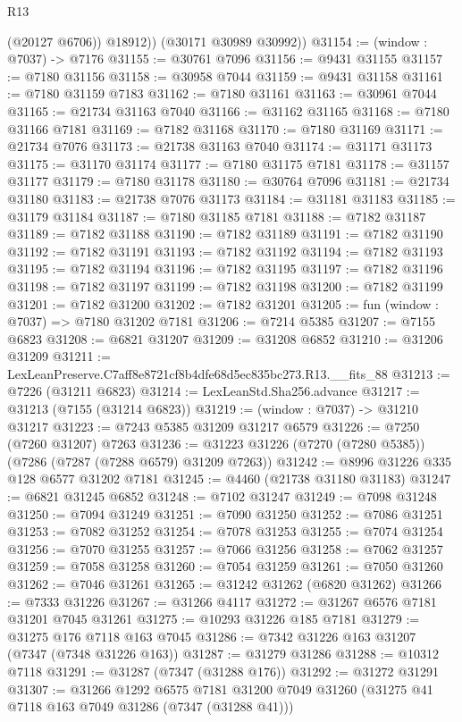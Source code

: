 \begin{lexlean}{R13}
\begin{coremodule}
            (@20127 @6706))
          @18912))
      (@30171 @30989 @30992))
@31154 := (window : @7037) -> @7176
@31155 := @30761 @7096
@31156 := @9431 @31155
@31157 := @7180 @31156
@31158 := @30958 @7044
@31159 := @9431 @31158
@31161 := @7180 @31159 @7183
@31162 := @7180 @31161
@31163 := @30961 @7044
@31165 := @21734 @31163 @7040
@31166 := @31162 @31165
@31168 := @7180 @31166 @7181
@31169 := @7182 @31168
@31170 := @7180 @31169
@31171 := @21734 @7076
@31173 := @21738 @31163 @7040
@31174 := @31171 @31173
@31175 := @31170 @31174
@31177 := @7180 @31175 @7181
@31178 := @31157 @31177
@31179 := @7180 @31178
@31180 := @30764 @7096
@31181 := @21734 @31180
@31183 := @21738 @7076 @31173
@31184 := @31181 @31183
@31185 := @31179 @31184
@31187 := @7180 @31185 @7181
@31188 := @7182 @31187
@31189 := @7182 @31188
@31190 := @7182 @31189
@31191 := @7182 @31190
@31192 := @7182 @31191
@31193 := @7182 @31192
@31194 := @7182 @31193
@31195 := @7182 @31194
@31196 := @7182 @31195
@31197 := @7182 @31196
@31198 := @7182 @31197
@31199 := @7182 @31198
@31200 := @7182 @31199
@31201 := @7182 @31200
@31202 := @7182 @31201
@31205 := fun (window : @7037) => @7180 @31202 @7181
@31206 := @7214 @5385
@31207 := @7155 @6823
@31208 := @6821 @31207
@31209 := @31208 @6852
@31210 := @31206 @31209
@31211 := LexLeanPreserve.C7aff8e8721cf8b4dfe68d5ec835bc273.R13.__fits_88
@31213 := @7226 (@31211 @6823)
@31214 := LexLeanStd.Sha256.advance
@31217 := @31213 (@7155 (@31214 @6823))
@31219 := (window : @7037) -> @31210 @31217
@31223 := @7243 @5385 @31209 @31217 @6579
@31226 := @7250 (@7260 @31207) @7263
@31236 := @31223 @31226 (@7270 (@7280 @5385)) (@7286 (@7287 (@7288 @6579) @31209 @7263))
@31242 := @8996 @31226 @335 @128 @6577 @31202 @7181
@31245 := @4460 (@21738 @31180 @31183)
@31247 := @6821 @31245 @6852
@31248 := @7102 @31247
@31249 := @7098 @31248
@31250 := @7094 @31249
@31251 := @7090 @31250
@31252 := @7086 @31251
@31253 := @7082 @31252
@31254 := @7078 @31253
@31255 := @7074 @31254
@31256 := @7070 @31255
@31257 := @7066 @31256
@31258 := @7062 @31257
@31259 := @7058 @31258
@31260 := @7054 @31259
@31261 := @7050 @31260
@31262 := @7046 @31261
@31265 := @31242 @31262 (@6820 @31262)
@31266 := @7333 @31226
@31267 := @31266 @4117
@31272 := @31267 @6576 @7181 @31201 @7045 @31261
@31275 := @10293 @31226 @185 @7181
@31279 := @31275 @176 @7118 @163 @7045
@31286 := @7342 @31226 @163 @31207 (@7347 (@7348 @31226 @163))
@31287 := @31279 @31286
@31288 := @10312 @7118
@31291 := @31287 (@7347 (@31288 @176))
@31292 := @31272 @31291
@31307 := @31266
    @1292
    @6575
    @7181
    @31200
    @7049
    @31260
    (@31275 @41 @7118 @163 @7049 @31286 (@7347 (@31288 @41)))

\end{coremodule}
\end{lexlean}
